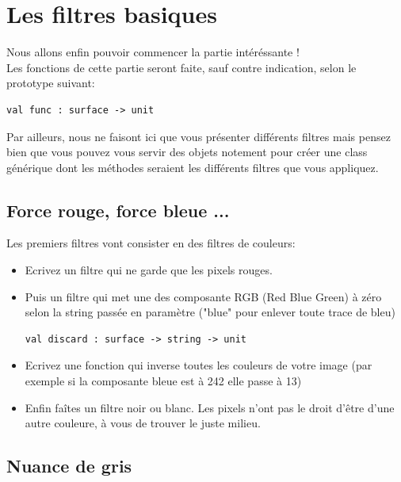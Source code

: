 \documentclass[a4paper]{article}
\begin{document}
\section{Les filtres basiques}

Nous allons enfin pouvoir commencer la partie intéréssante !\\
Les fonctions de cette partie seront faite, sauf contre indication, selon le prototype suivant:

\vspace{3mm}
\begin{verbatim}
val func : surface -> unit
\end{verbatim}
\vspace{3mm}

Par ailleurs, nous ne faisont ici que vous présenter différents filtres mais pensez bien que vous pouvez vous servir des objets notement pour créer une class générique dont les méthodes seraient les différents filtres que vous appliquez.

\subsection{Force rouge, force bleue ...}
Les premiers filtres vont consister en des filtres de couleurs:\\
\begin{itemize}
\item Ecrivez un filtre qui ne garde que les pixels rouges.
\item Puis un filtre qui met une des composante RGB (Red Blue Green) à zéro selon la string 
passée en paramètre ("blue" pour enlever toute trace de bleu)

\vspace{3mm}
\begin{verbatim}
val discard : surface -> string -> unit
\end{verbatim}
\vspace{3mm}

\item Ecrivez une fonction qui inverse toutes les couleurs de votre image (par exemple si la composante bleue est à 242 elle passe à 13)

\item Enfin faîtes un filtre noir ou blanc. Les pixels n'ont pas le droit d'être d'une autre couleure, à vous de trouver le juste milieu.

\end{itemize}
\subsection{Nuance de gris}
\end{document}
